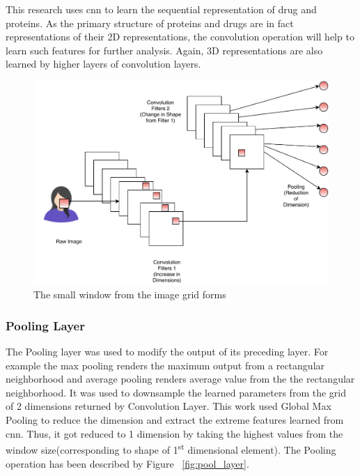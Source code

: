   This research uses \acrfull{cnn} to learn the sequential representation of drug and proteins. As the primary structure of proteins and drugs are in fact representations of their 2D representations, the convolution operation will help to learn such features for further analysis. Again, 3D representations are also learned by higher layers of convolution layers. \cite{Adhikari2017}

  \begin{figure}
    \centering
    \includegraphics[width=.5\linewidth]{mainmatter/3-Methodology/images/System-Block-CNN-Layer.pdf}
    \caption[Working of CNN Block]{The small window from the image grid forms }
    \label{fig:cnn}
  \end{figure}
  
  \subsubsection{Pooling Layer}
  
  The Pooling layer was used to modify the output of its preceding layer. For example the max pooling renders the maximum output from a rectangular neighborhood and average pooling renders average value from the the rectangular neighborhood. It was used to downsample the learned parameters from the grid of 2 dimensions returned by Convolution Layer. This work used Global Max Pooling to reduce the dimension and extract the extreme features learned from \acrshort{cnn}. Thus, it got reduced to 1 dimension by taking the highest values from the window size(corresponding to shape of 1\textsuperscript{st} dimensional element). The Pooling operation has been described by Figure ~\ref{fig:pool_layer}.


